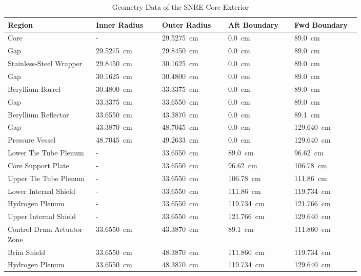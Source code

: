 \documentclass[8pt,a5paper]{article}
\begin{document}
\begin{table}[h!]
    \label{table: Table 4}
    \centering
    \small
    \caption{Geometry Data of the SNRE Core Exterior}
    \begin{tabular}{|m{0.2\linewidth}|m{0.15\linewidth}|m{0.15\linewidth}|m{0.15\linewidth}|m{0.15\linewidth}|}
    \hline
    Region & Inner Radius & Outer Radius& Aft Boundary& Fwd Boundary\\\hline
    Core & - & \SI{29.5275}{cm} & \SI{0.0}{cm} & \SI{89.0}{cm} \\
    Gap & \SI{29.5275}{cm} & \SI{29.8450}{cm} &  \SI{0.0}{cm} & \SI{89.0}{cm} \\
    Stainless-Steel Wrapper & \SI{29.8450}{cm} & \SI{30.1625}{cm} &  \SI{0.0}{cm} & \SI{89.0}{cm} \\
    Gap & \SI{30.1625}{cm} & \SI{30.4800}{cm} &  \SI{0.0}{cm} & \SI{89.0}{cm} \\
    Beryllium Barrel & \SI{30.4800}{cm} & \SI{33.3375}{cm} &  \SI{0.0}{cm} & \SI{89.0}{cm} \\
    Gap & \SI{33.3375}{cm} & \SI{33.6550}{cm} &  \SI{0.0}{cm} & \SI{89.0}{cm} \\
    Beryllium Reflector & \SI{33.6550}{cm} & \SI{43.3870}{cm} & \SI{0.0}{cm} & \SI{89.1}{cm} \\
    Gap & \SI{43.3870}{cm} & \SI{48.7045}{cm} &  \SI{0.0}{cm} & \SI{129.640}{cm} \\
    Pressure Vessel & \SI{48.7045}{cm} & \SI{49.2633}{cm} &  \SI{0.0}{cm} & \SI{129.640}{cm} \\
    Lower Tie Tube Plenum & - & \SI{33.6550}{cm} & \SI{89.0}{cm} & \SI{96.62}{cm} \\
    Core Support Plate & - & \SI{33.6550}{cm} & \SI{96.62}{cm} & \SI{106.78}{cm} \\
    Upper Tie Tube Plenum & - & \SI{33.6550}{cm} & \SI{106.78}{cm} & \SI{111.86}{cm} \\
    Lower Internal Shield & - & \SI{33.6550}{cm} & \SI{111.86}{cm} & \SI{119.734}{cm} \\
    Hydrogen Plenum & - & \SI{33.6550}{cm} & \SI{119.734}{cm} & \SI{121.766}{cm} \\
    Upper Internal Shield & - & \SI{33.6550}{cm} & \SI{121.766}{cm} & \SI{129.640}{cm} \\
    Control Drum Actuator Zone & \SI{33.6550}{cm} & \SI{43.3870}{cm} & \SI{89.1}{cm} & \SI{111.860}{cm} \\
    Brim Shield & \SI{33.6550}{cm} & \SI{48.3870}{cm} & \SI{111.860}{cm} & \SI{119.734}{cm} \\
    Hydrogen Plenum & \SI{33.6550}{cm} & \SI{48.3870}{cm} & \SI{119.734}{cm} & \SI{129.640}{cm} \\\hline
    \end{tabular}
\end{table}
\end{document}
